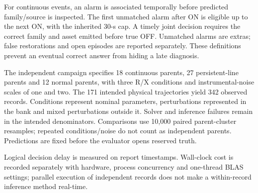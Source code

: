 For continuous events, an alarm is associated temporally before predicted family/source is inspected. The first unmatched alarm after ON is eligible up to the next ON, with the inherited 30-s cap. A timely joint decision requires the correct family and asset emitted before true OFF. Unmatched alarms are extras; false restorations and open episodes are reported separately. These definitions prevent an eventual correct answer from hiding a late diagnosis.

The independent campaign specifies 18 continuous parents, 27 persistent-line parents and 12 normal parents, with three R/X conditions and instrumental-noise scales of one and two. The 171 intended physical trajectories yield 342 observed records. Conditions represent nominal parameters, perturbations represented in the bank and mixed perturbations outside it. Solver and inference failures remain in the intended denominators. Comparisons use 10,000 paired parent-cluster resamples; repeated conditions/noise do not count as independent parents. Predictions are fixed before the evaluator opens reserved truth.

Logical decision delay is measured on report timestamps. Wall-clock cost is recorded separately with hardware, process concurrency and one-thread BLAS settings; parallel execution of independent records does not make a within-record inference method real-time. 
